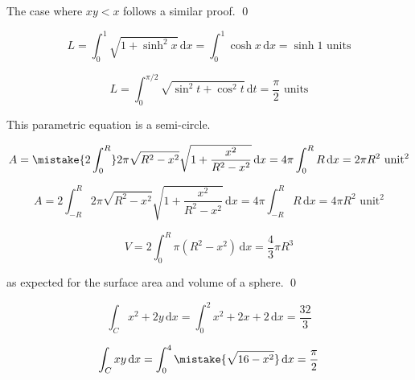 \documentclass[12pt]{article}
\begin{document}
The case where $xy < x$ follows a similar proof.
\qed




\begin{equation}
    L = \int_{0}^{1} \sqrt{1 + \sinh^{2}{x}} \, \mathrm{d}x = \int_{0}^{1} \cosh{x} \, \mathrm{d}x = \sinh{1} \text{ units}
\end{equation}


\begin{equation}
    L = \int_{0}^{\pi/2} \sqrt{\sin^{2}{t} + \cos^{2}{t}} \, \mathrm{d}t = \frac{\pi}{2} \text{ units}
\end{equation}

This parametric equation is a semi-circle.


\begin{equation}
    A = \mistake{2 \int_{0}^{R}} 2\pi \sqrt{R^{2} - x^{2}} \sqrt{1 + \frac{x^{2}}{R^{2} - x^{2}}} \, \mathrm{d}x = 4\pi \int_{0}^{R} R \, \mathrm{d}x = 2\pi R^{2} \text{ unit}^{2}
\end{equation}

\begin{correction}
    \begin{equation}
        A = 2 \int_{-R}^{R} 2\pi \sqrt{R^{2} - x^{2}} \sqrt{1 + \frac{x^{2}}{R^{2} - x^{2}}} \, \mathrm{d}x = 4\pi \int_{-R}^{R} R \, \mathrm{d}x = 4\pi R^{2} \text{ unit}^{2}
    \end{equation}
\end{correction}

\begin{equation}
    V = 2 \int_{0}^{R} \pi (R^{2} - x^{2}) \, \mathrm{d}x = \frac{4}{3} \pi R^{3}
\end{equation}

as expected for the surface area and volume of a sphere.
\qed




\begin{equation}
    \int_{C} x^{2} + 2y \, \mathrm{d}x = \int_{0}^{2} x^{2} + 2x + 2 \, \mathrm{d}x = \frac{32}{3}
\end{equation}


\begin{equation}
    \int_{C} xy \, \mathrm{d}x = \int_{0}^{4} \mistake{\sqrt{16 - x^{2}}} \, \mathrm{d}x = \frac{\pi}{2}
\end{equation}
\end{document}
